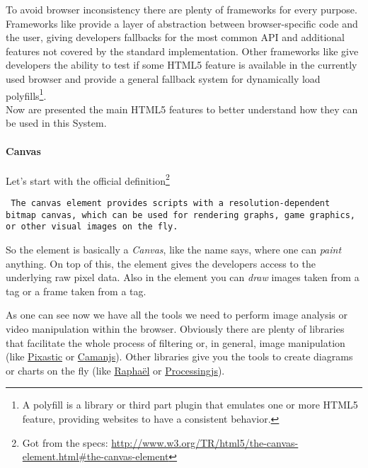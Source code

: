 To avoid browser inconsistency there are plenty of \js{} frameworks for every
purpose. Frameworks like  provide a layer of abstraction between
browser-specific code and the user, giving developers fallbacks for the most
common API and additional features not covered by the standard implementation.
Other frameworks like  give developers the ability to test
if some \ac{HTML}5 feature is available in the currently used browser and provide
a general fallback system for dynamically load polyfills\footnote{A polyfill is
a \js{} library or third part plugin that emulates one or more HTML5 feature,
providing websites to have a consistent behavior.}.\\


Now are presented the main \ac{HTML}5 features to better understand how they can
be used in this System.





\paragraph{Canvas}
Let's start with the official definition\footnote{Got from the specs:
\url{http://www.w3.org/TR/html5/the-canvas-element.html\#the-canvas-element}}
\begin{quoting}\rm\tt
	The canvas element provides scripts with a resolution-dependent bitmap canvas, which can
	be used for rendering graphs, game graphics, or other visual images on the fly.
\end{quoting}

So the  element is basically a \emph{Canvas}, like the name says, where
one can \emph{paint} anything. On top of this, the  element gives
the developers access to the underlying raw pixel data. Also in the 
element you can \emph{draw} images taken from a  tag or a frame taken
from a  tag.

As one can see now we have all the tools we need to perform image analysis or
video manipulation within the browser. Obviously there are plenty of \js{}
libraries that facilitate the whole process of filtering or, in general, image
manipulation (like \href{http://www.pixastic.com/}{Pixastic} or
\href{http://camanjs.com/}{Camanjs}). Other libraries give you the tools to
create diagrams or charts on the fly (like \href{http://raphaeljs.com/}{Raphaël}
or \href{http://processingjs.org/}{Processingjs}).

